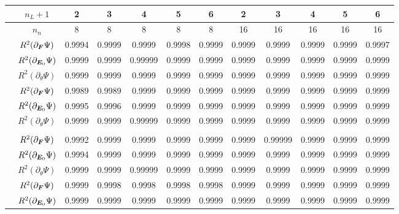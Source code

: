 \begin{table}[hbtp!]
	\centering
	\begin{tabular}{c c c c c c c c c c c c}
		\toprule
		\rowcolor{gray!30}	\small{} & $n_L+1$ & 2 &  3& 4& 5& 6& 2& 3& 4& 5 & 6\\
		\midrule 
		\rowcolor{gray!30}	\small{} & $n_n$ & 8 & 8& 8& 8 &8 &16& 16& 16& 16 &  16\\
		\midrule
		\multirow{3}{*}{\rotatebox{90}{\textcolor{red}{\textbf{MR}}/\textcolor{blue}{\textbf{ID}}}}  &$R^2(\partial_{\boldsymbol{F}}\Psi)$ & 0.9994&  0.9999 & 0.9999 & 0.9998 & 0.9999 & 0.9999 & 0.9999 & 0.9999 & 0.9999 & 0.9997\\
		&$R^2(\partial_{\boldsymbol{E}_0}\Psi)$ & 0.9999 &  0.9999 & 0.99999 & 0.9999 & 0.9999 & 0.9999 & 0.9999 & 0.9999 & 0.9999 & 0.9999\\
		&$R^2(\partial_{\theta}\Psi)$ & 0.9999 & 0.9999 & 0.9999 & 0.9999 & 0.9999 & 0.9999 & 0.9999 & 0.9999 & 0.9999 & 0.9999\\	
		\midrule
		\multirow{3}{*}{\rotatebox{90}{\textcolor{red}{\textbf{QMR}}/\textcolor{blue}{\textbf{ID}}}} &$R^2(\partial_{\boldsymbol{F}}\Psi)$ & 0.9989 & 0.9989 & 0.9999 & 0.9999 & 0.9999 & 0.9999 & 0.9999 & 0.9999 & 0.9999 & 0.9999\\
		&$R^2(\partial_{\boldsymbol{E}_0}\Psi)$ & 0.9995 & 0.9996 & 0.9999 & 0.9999 & 0.9999 & 0.9999 & 0.9999 & 0.9999 & 0.9999 & 0.9999\\
		&$R^2(\partial_{\theta}\Psi)$ & 0.9999 &  0.9999 & 0.99999 & 0.9999 & 0.9999 & 0.9999 & 0.9999 & 0.9999 & 0.9999 & 0.9999\\
		\\
		\midrule
		\multirow{3}{*}{\rotatebox{90}{\textcolor{red}{\textbf{Y}}/\textcolor{blue}{\textbf{ID}}}} &$R^2(\partial_{\boldsymbol{F}}\Psi)$ & 0.9992 & 0.9999 & 0.9999 & 0.9999 & 0.9999 & 0.9999 & 0.99999 & 0.9999 & 0.9999  & 0.9999\\
&$R^2(\partial_{\boldsymbol{E}_0}\Psi)$ & 0.9994 &  0.9999 & 0.9999 & 0.9999 & 0.9999 & 0.9999 & 0.9999 & 0.9999 & 0.9999 & 0.9999\\
&$R^2(\partial_{\theta}\Psi)$ & 0.9999 &  0.9999 & 0.99999 & 0.9999 & 0.9999 & 0.9999 & 0.9999 & 0.9999 & 0.9999 & 0.9999\\	
\midrule
		\multirow{3}{*}{\rotatebox{90}{\textcolor{red}{\textbf{G}}/\textcolor{blue}{\textbf{ID}}}} &$R^2(\partial_{\boldsymbol{F}}\Psi)$ & 0.9999  & 0.9998 & 0.9998 & 0.9998 & 0.9998 & 0.9999 & 0.9999 & 0.9999 & 0.9999 & 0.9999\\
&$R^2(\partial_{\boldsymbol{E}_0}\Psi)$ & 0.9999 & 0.9999 & 0.9999 & 0.9999 & 0.9999 & 0.9999 & 0.9999 & 0.9999 & 0.9999 & 0.9999\\

\end{tabular}
\end{table}
